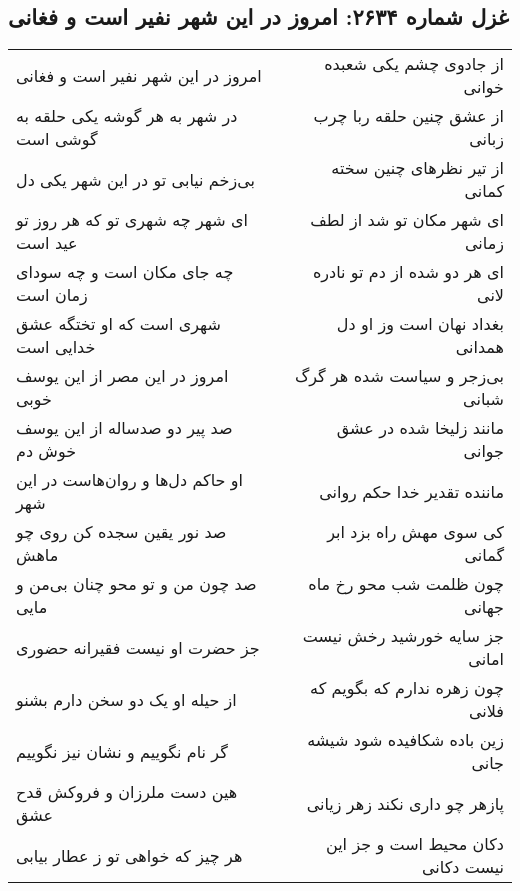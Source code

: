 \begin{center}
\section*{غزل شماره ۲۶۳۴: امروز در این شهر نفیر است و فغانی}
\label{sec:2634}
\begin{longtable}{l p{0.5cm} r}
امروز در این شهر نفیر است و فغانی
&&
از جادوی چشم یکی شعبده خوانی
\\
در شهر به هر گوشه یکی حلقه به گوشی است
&&
از عشق چنین حلقه ربا چرب زبانی
\\
بی‌زخم نیابی تو در این شهر یکی دل
&&
از تیر نظرهای چنین سخته کمانی
\\
ای شهر چه شهری تو که هر روز تو عید است
&&
ای شهر مکان تو شد از لطف زمانی
\\
چه جای مکان است و چه سودای زمان است
&&
ای هر دو شده از دم تو نادره لانی
\\
شهری است که او تختگه عشق خدایی است
&&
بغداد نهان است وز او دل همدانی
\\
امروز در این مصر از این یوسف خوبی
&&
بی‌زجر و سیاست شده هر گرگ شبانی
\\
صد پیر دو صدساله از این یوسف خوش دم
&&
مانند زلیخا شده در عشق جوانی
\\
او حاکم دل‌ها و روان‌هاست در این شهر
&&
ماننده تقدیر خدا حکم روانی
\\
صد نور یقین سجده کن روی چو ماهش
&&
کی سوی مهش راه بزد ابر گمانی
\\
صد چون من و تو محو چنان بی‌من و مایی
&&
چون ظلمت شب محو رخ ماه جهانی
\\
جز حضرت او نیست فقیرانه حضوری
&&
جز سایه خورشید رخش نیست امانی
\\
از حیله او یک دو سخن دارم بشنو
&&
چون زهره ندارم که بگویم که فلانی
\\
گر نام نگوییم و نشان نیز نگوییم
&&
زین باده شکافیده شود شیشه جانی
\\
هین دست ملرزان و فروکش قدح عشق
&&
پازهر چو داری نکند زهر زیانی
\\
هر چیز که خواهی تو ز عطار بیابی
&&
دکان محیط است و جز این نیست دکانی
\\
\end{longtable}
\end{center}
